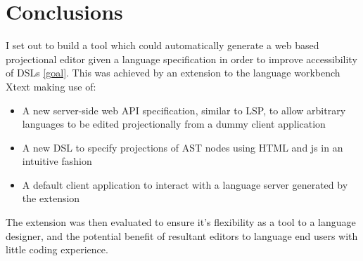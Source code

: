 \documentclass{article}
\begin{document}
\section{Conclusions}\label{conclusion}
I set out to build a tool which could automatically generate a web based projectional editor given a language specification in order to improve accessibility of DSLs \ref{goal}. This was achieved by an extension to the language workbench Xtext making use of:
\begin{itemize}
\item{A new server-side web API specification, similar to LSP, to allow arbitrary languages to be edited projectionally from a dummy client application}
\item{A new DSL to specify projections of AST nodes using HTML and js in an intuitive fashion}
\item{A default client application to interact with a language server generated by the extension}
\end{itemize}
The extension was then evaluated to ensure it's flexibility as a tool to a language designer, and the potential benefit of resultant editors to language end users with little coding experience.
\end{document}
